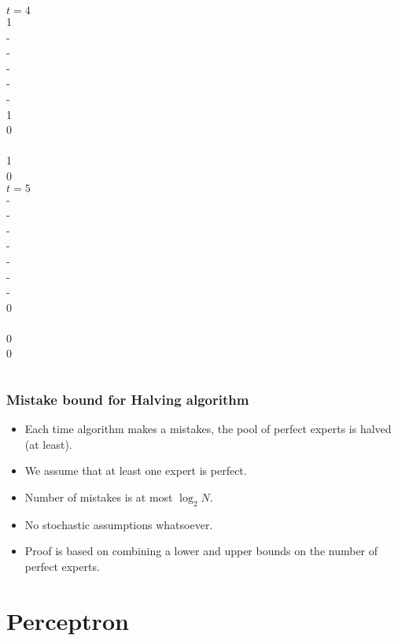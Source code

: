 \documentclass[handout]{beamer}
\begin{document}
\begin{frame}
\begin{columns}
\column[t]{1cm}	    		     
 $t=4$ \\ 1 \\ - \\ -  \\ - \\ - \\ - \\ 1  \\ 0 \\ ~ \\
\color<14>{red} 1 \\
 0 \\
		    			     
\column[t]{1cm}	    		     
 $t=5$ \\ - \\ - \\ -  \\ - \\ - \\ - \\ -  \\ 0 \\ ~ \\
\color<17>{red} 0 \\
 0 \\

\end{columns} 
\end{frame} 

\begin{frame}
\frametitle{Mistake bound for Halving algorithm}
\begin{itemize}
\item 
Each time algorithm makes a mistakes, the pool of perfect experts is halved (at least).
\item
We assume that at least one expert is perfect.
\item
Number of mistakes is at most $\log_2 N$.
\item
No stochastic assumptions whatsoever.
\item
Proof is based on combining a lower and upper bounds on the number of perfect experts.
\end{itemize}
\end{frame}


\section{Perceptron}
\end{document}
